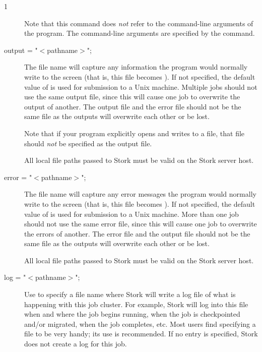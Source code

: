 \begin{ManPage}{\label{man-stork-submit}}{1}
\begin{description}
Note that this command does \emph{not} refer to the command-line
arguments of the program.  The command-line arguments are specified by
the  command.


\item[output = "$<$pathname$>$";]
The  file name will capture
any information the program would normally write to the screen
(that is, this file becomes ).
If not specified, the default value of
 is used for submission to a Unix machine.
Multiple jobs should not use the same output
file, since this will cause one job to overwrite the output of
another.
The output file and the error file should not be the same file
as the outputs will overwrite each other or be lost.

Note that if your program explicitly opens and writes to a file,
that file should \emph{not} be specified as the output file.

All local file paths passed to Stork must be valid on the Stork server host.


\item[error = "$<$pathname$>$";]
The  file name will capture any
error messages the program would normally write to the screen
(that is, this file becomes ).
If not specified, the default value of
 is used for submission to a Unix machine.
More than one job should not use the same error file, since
this will cause one job to overwrite the errors of another.
The error file and the output file should not be the same file
as the outputs will overwrite each other or be lost.

All local file paths passed to Stork must be valid on the Stork server host.


\item[log = "$<$pathname$>$";]
Use  to specify a file name where
Stork will write a log file of what is happening with this job cluster.
For example, Stork will log into this file when and where the job
begins running, when the job is checkpointed and/or migrated, when the
job completes, etc. Most users find specifying a  file to be very
handy; its use is recommended. If no  entry is specified, 
Stork does not create a log for this job.


\end{description}
\end{ManPage}
